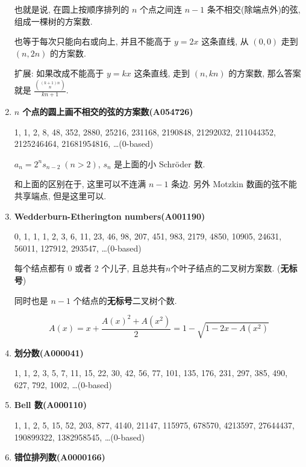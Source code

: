 \begin{enumerate}
          也就是说, 在圆上按顺序排列的 \(n\) 个点之间连 \(n - 1\) 条不相交(除端点外)的弦, 组成一棵树的方案数.
          
          也等于每次只能向右或向上, 并且不能高于 \(y = 2x\) 这条直线, 从 \((0, 0)\) 走到 \((n, 2n)\) 的方案数.
          
          扩展: 如果改成不能高于 \(y = kx\) 这条直线, 走到 \((n, kn)\) 的方案数, 那么答案就是 \( \frac {{(k + 1)n \choose n}} {kn + 1} \).
          
    \item \textbf{\(n\) 个点的圆上画不相交的弦的方案数(A054726)}
          
          1, 1, 2, 8, 48, 352, 2880, 25216, 231168, 2190848, 21292032, 211044352, 2125246464, 21681954816, \dots \;(0-based)
          
          \( a_n = 2^n s_{n - 2} \; (n > 2) \), \(s_n\) 是上面的小 Schr\"oder 数.
          
          和上面的区别在于, 这里可以不连满 \(n-1\) 条边. 另外 Motzkin 数画的弦不能共享端点, 但是这里可以.
          
    \item \textbf{Wedderburn-Etherington numbers(A001190)}
          
          0, 1, 1, 1, 2, 3, 6, 11, 23, 46, 98, 207, 451, 983, 2179, 4850, 10905, 24631, 56011, 127912, 293547, \dots \;(0-based)
          
          每个结点都有 \(0\) 或者 \(2\) 个儿子, 且总共有\(n\)个叶子结点的二叉树方案数. (\textbf{无标号})
          
          同时也是 \(n-1\) 个结点的\textbf{无标号}二叉树个数.
          
          \[
              A(x) = x + \frac {A(x) ^ 2 + A(x ^ 2)} 2 = 1 - \sqrt{1 - 2x - A(x ^ 2)}
          \]
          
    \item \textbf{划分数(A000041)}
          
          1, 1, 2, 3, 5, 7, 11, 15, 22, 30, 42, 56, 77, 101, 135, 176, 231, 297, 385, 490, 627, 792, 1002, \dots \;(0-based)
          
    \item \textbf{Bell 数(A000110)}
          
          1, 1, 2, 5, 15, 52, 203, 877, 4140, 21147, 115975, 678570, 4213597, 27644437, 190899322, 1382958545, \dots \;(0-based)
          
    \item \textbf{错位排列数(A0000166)}
          

\end{enumerate}
